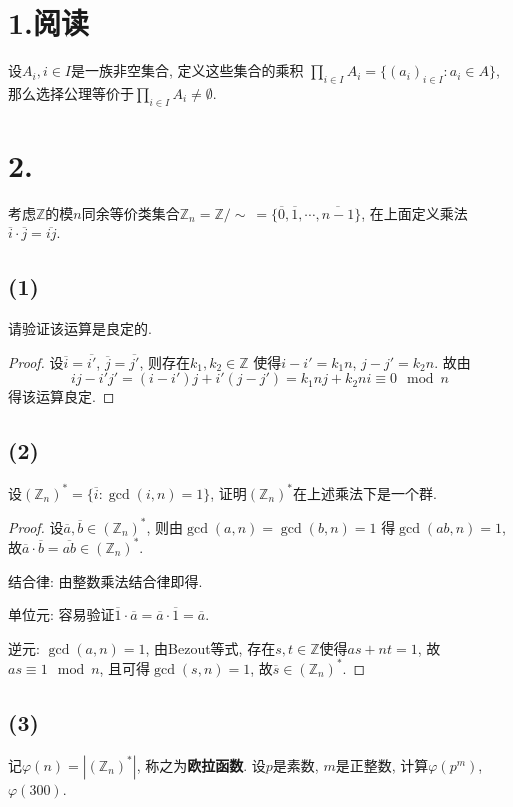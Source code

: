 \documentclass[12pt, a4paper, fontset=windows]{ctexart}
\newcommand{\Z}{\mathbb{Z}}
\newcommand{\abs}[1]{\left|{#1}\right|}
\newcommand{\cl}[1]{\overline{#1}} %
\begin{document}
\section*{1.阅读}

设$A_i,i\in I$是一族非空集合, 定义这些集合的乘积
$\prod_{i\in I}A_i=\{(a_i)_{i\in I}:a_i\in A\}$, 
那么选择公理等价于$\prod_{i\in I}A_i\ne\emptyset$. 

\section*{2.}

考虑$\Z$的模$n$同余等价类集合$\Z_n=\Z/\sim\ =\{\cl{0},\cl{1},\cdots,\cl{n-1}\}$, 
在上面定义乘法$\cl{i}\cdot\cl{j}=\cl{ij}$. 

\subsection*{(1)}

请验证该运算是良定的. 

\begin{proof}
设$\cl{i}=\cl{i'}$, $\cl{j}=\cl{j'}$, 则存在$k_1,k_2\in\Z$
使得$i-i'=k_1n$, $j-j'=k_2n$. 故由
\[ij-i'j'=(i-i')j+i'(j-j')=k_1nj+k_2ni\equiv 0\mod{n}\]
得该运算良定. 
\end{proof}

\subsection*{(2)}

设$(\Z_n)^*=\{\cl{i}:\gcd(i,n)=1\}$, 
证明$(\Z_n)^*$在上述乘法下是一个群. 

\begin{proof}
设$\cl{a},\cl{b}\in(\Z_n)^*$, 则由$\gcd(a,n)=\gcd(b,n)=1$
得$\gcd(ab,n)=1$, 故$\cl{a}\cdot\cl{b}=\cl{ab}\in(\Z_n)^*$. 

结合律: 
由整数乘法结合律即得. 

单位元: 
容易验证$\cl{1}\cdot\cl{a}=\cl{a}\cdot\cl{1}=\cl{a}$. 

逆元: 
$\gcd(a,n)=1$, 由Bezout等式, 存在$s,t\in\Z$使得$as+nt=1$, 
故$as\equiv 1\mod{n}$, 且可得$\gcd(s,n)=1$, 故$\cl{s}\in(\Z_n)^*$. 
\end{proof}

\subsection*{(3)}

记$\varphi(n)=\abs{(\Z_n)^*}$, 称之为{\bf 欧拉函数}. 
设$p$是素数, $m$是正整数, 计算$\varphi(p^m)$, $\varphi(300)$. 
\end{document}
